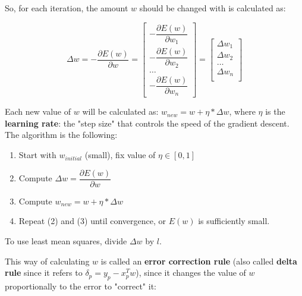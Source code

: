So, for each iteration, the amount $w$ should be changed with is calculated as:

\begin{equation*}
    \Delta w = - \dfrac{\partial E(w)}{\partial w} =
    \begin{bmatrix}
    - \dfrac{\partial E(w)}{\partial w_1}\\
    - \dfrac{\partial E(w)}{\partial w_2}\\
    \dots\\
    - \dfrac{\partial E(w)}{\partial w_n}
    \end{bmatrix}
    =
    \begin{bmatrix}
    \Delta w_1\\
    \Delta w_2\\
    \dots\\
    \Delta w_n\\
    \end{bmatrix}
\end{equation*}

Each new value of $w$ will be calculated as: $w_{new} = w + \eta*\Delta w$, where $\eta$ is the \textbf{learning rate}: the "step size" that controls the speed of the gradient descent. The algorithm is the following:

\begin{enumerate}
    \item Start with $w_{initial}$ (small), fix value of $\eta \in [0,1]$

    \item Compute $\Delta w = \dfrac{\partial E(w)}{\partial w}$

    \item Compute $w_{new} = w + \eta*\Delta w$

    \item Repeat (2) and (3) until convergence, or $E(w)$ is sufficiently small.
\end{enumerate}
To use least mean squares, divide $\Delta w$ by $l$.

This way of calculating $w$ is called an \textbf{error correction rule} (also called \textbf{delta rule} since it refers to $\delta_p = y_p - x_p^Tw$), since it changes the value of $w$ proportionally to the error to "correct" it:

